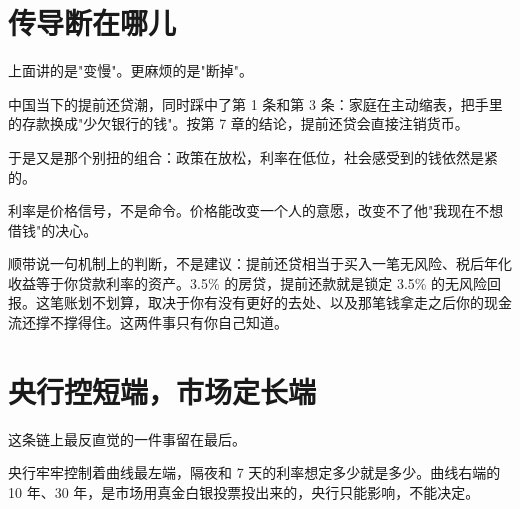 \section{传导断在哪儿}

上面讲的是"变慢"。更麻烦的是"断掉"。

\begin{flowlist}
\end{flowlist}

中国当下的提前还贷潮，同时踩中了第 1 条和第 3 条：家庭在主动缩表，把手里的存款换成"少欠银行的钱"。按第 7 章的结论，提前还贷会直接注销货币。

于是又是那个别扭的组合：政策在放松，利率在低位，社会感受到的钱依然是紧的。

\begin{pullquote}{}
利率是价格信号，不是命令。价格能改变一个人的意愿，改变不了他"我现在不想借钱"的决心。
\end{pullquote}

顺带说一句机制上的判断，不是建议：提前还贷相当于买入一笔无风险、税后年化收益等于你贷款利率的资产。3.5\% 的房贷，提前还款就是锁定 3.5\% 的无风险回报。这笔账划不划算，取决于你有没有更好的去处、以及那笔钱拿走之后你的现金流还撑不撑得住。这两件事只有你自己知道。

\section{央行控短端，市场定长端}

这条链上最反直觉的一件事留在最后。

央行牢牢控制着曲线最左端，隔夜和 7 天的利率想定多少就是多少。曲线右端的 10 年、30 年，是市场用真金白银投票投出来的，央行只能影响，不能决定。

